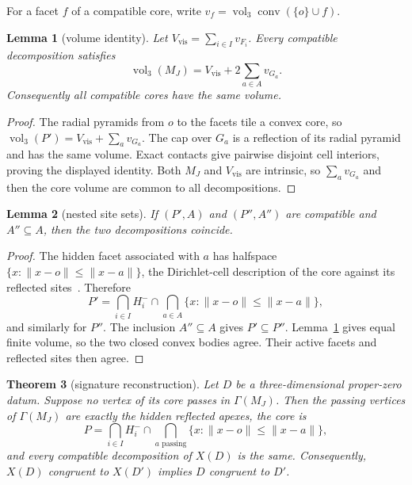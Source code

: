 \documentclass[11pt]{amsart}
\newtheorem{theorem}{Theorem}[section]
\newtheorem{lemma}[theorem]{Lemma}
\theoremstyle{definition}
\newcommand{\conv}{\operatorname{conv}}
\newcommand{\vol}{\operatorname{vol}}
\newcommand{\GammaM}{\Gamma(M_J)}
\begin{document}
For a facet $f$ of a compatible core, write
$v_f=\vol_3\conv(\{o\}\cup f)$.

\begin{lemma}[volume identity]
\label{lem:volume}
Let $V_{\mathrm{vis}}=\sum_{i\in I}v_{F_i}$.  Every compatible decomposition satisfies
\[
 \vol_3(M_J)=V_{\mathrm{vis}}+2\sum_{a\in A}v_{G_a}.
\]
Consequently all compatible cores have the same volume.
\end{lemma}

\begin{proof}
The radial pyramids from $o$ to the facets tile a convex core, so
$\vol_3(P')=V_{\mathrm{vis}}+\sum_av_{G_a}$.  The cap over $G_a$ is a reflection of its radial
pyramid and has the same volume.  Exact contacts give pairwise disjoint cell
interiors, proving the displayed identity.  Both $M_J$ and
$V_{\mathrm{vis}}$ are intrinsic,
so $\sum_av_{G_a}$ and then the core volume are common to all decompositions.
\end{proof}

\begin{lemma}[nested site sets]
\label{lem:nested}
If $(P',A)$ and $(P'',A'')$ are compatible and $A''\subseteq A$, then the two
decompositions coincide.
\end{lemma}

\begin{proof}
The hidden facet associated with $a$ has halfspace
$\{x:\|x-o\|\le\|x-a\|\}$, the Dirichlet-cell description of the core
against its reflected sites~\cite{AshBolker1985}.  Therefore
\[
 P'=\bigcap_{i\in I}H_i^-\cap
     \bigcap_{a\in A}\{x:\|x-o\|\le\|x-a\|\},
\]
and similarly for $P''$.  The inclusion $A''\subseteq A$ gives
$P'\subseteq P''$.  Lemma~\ref{lem:volume} gives equal finite volume, so the
two closed convex bodies agree.  Their active facets and reflected sites then
agree.
\end{proof}

\begin{theorem}[signature reconstruction]
\label{thm:signature}
Let $D$ be a three-dimensional proper-zero datum.  Suppose no vertex of its
core passes in $\GammaM$.  Then the passing vertices of $\GammaM$ are exactly
the hidden reflected apexes, the core is
\[
 P=\bigcap_{i\in I}H_i^-\cap
   \bigcap_{a\text{ passing}}\{x:\|x-o\|\le\|x-a\|\},
\]
and every compatible decomposition of $X(D)$ is the same.  Consequently,
$X(D)$ congruent to $X(D')$ implies $D$ congruent to $D'$.
\end{theorem}
\end{document}

